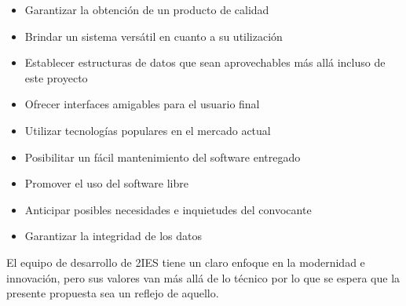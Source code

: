 \begin{itemize}
    \item Garantizar la obtención de un producto de calidad
    \item Brindar un sistema versátil en cuanto a su utilización
    \item Establecer estructuras de datos que sean aprovechables más allá incluso de este proyecto
    \item Ofrecer interfaces amigables para el usuario final
    \item Utilizar tecnologías populares en el mercado actual
    \item Posibilitar un fácil mantenimiento del software entregado
    \item Promover el uso del software libre
    \item Anticipar posibles necesidades e inquietudes del convocante
    \item Garantizar la integridad de los datos
\end{itemize}

El  equipo de desarrollo de 2IES tiene un claro enfoque en la modernidad e innovación, pero sus valores van más allá de lo técnico por lo que se espera que la presente propuesta sea un reflejo de aquello.